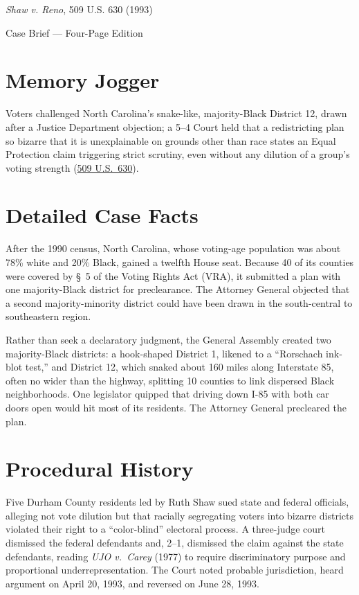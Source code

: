 \documentclass[12pt]{article}
\begin{document}
\begin{center}
{\LARGE \textit{Shaw v. Reno}, 509 U.S. 630 (1993)\par}
\vspace{0.8em}
{\large Case Brief --- Four-Page Edition\par}
\end{center}
\vspace{1em}

\section{Memory Jogger}

Voters challenged North Carolina's snake-like, majority-Black District 12, drawn after a Justice Department objection; a 5--4 Court held that a redistricting plan so bizarre that it is unexplainable on grounds other than race states an Equal Protection claim triggering strict scrutiny, even without any dilution of a group's voting strength (\href{https://supreme.justia.com/cases/federal/us/509/630/}{509 U.S.\ 630}).

\section{Detailed Case Facts}

After the 1990 census, North Carolina, whose voting-age population was about 78\% white and 20\% Black, gained a twelfth House seat. Because 40 of its counties were covered by \S\ 5 of the Voting Rights Act (VRA), it submitted a plan with one majority-Black district for preclearance. The Attorney General objected that a second majority-minority district could have been drawn in the south-central to southeastern region.

Rather than seek a declaratory judgment, the General Assembly created two majority-Black districts: a hook-shaped District 1, likened to a ``Rorschach ink-blot test,'' and District 12, which snaked about 160 miles along Interstate 85, often no wider than the highway, splitting 10 counties to link dispersed Black neighborhoods. One legislator quipped that driving down I-85 with both car doors open would hit most of its residents. The Attorney General precleared the plan.

\section{Procedural History}

Five Durham County residents led by Ruth Shaw sued state and federal officials, alleging not vote dilution but that racially segregating voters into bizarre districts violated their right to a ``color-blind'' electoral process. A three-judge court dismissed the federal defendants and, 2--1, dismissed the claim against the state defendants, reading \textit{UJO v.\ Carey} (1977) to require discriminatory purpose and proportional underrepresentation. The Court noted probable jurisdiction, heard argument on April 20, 1993, and reversed on June 28, 1993.
\end{document}
